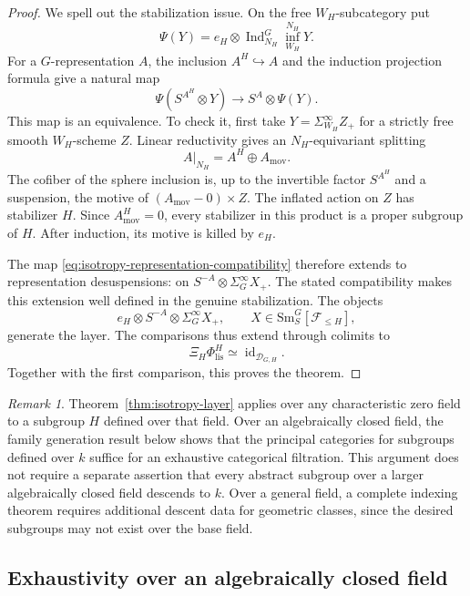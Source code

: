 \documentclass[11pt,reqno]{amsart}
\theoremstyle{definition}
\theoremstyle{remark}
\newtheorem{remark}[theorem]{Remark}
\theoremstyle{plain}
\numberwithin{equation}{section}
\newcommand{\Sm}{\mathrm{Sm}}
\newcommand{\lis}{\mathrm{lis}}
\newcommand{\D}{\mathcal D}
\newcommand{\F}{\mathcal F}
\begin{document}
\begin{proof}
We spell out the stabilization issue.
On the free \(W_H\)-subcategory put
\[
 \Psi(Y)=e_H\otimes
 \operatorname{Ind}_{N_H}^G\operatorname{inf}_{W_H}^{N_H}Y.
\]
For a \(G\)-representation \(A\), the inclusion \(A^H\hookrightarrow A\)
and the induction projection formula give a natural map
\begin{equation}\label{eq:isotropy-representation-compatibility}
 \Psi(S^{A^H}\otimes Y)\longrightarrow S^A\otimes\Psi(Y).
\end{equation}
This map is an equivalence.
To check it, first take \(Y=\Sigma^\infty_{W_H}Z_+\) for a strictly
free smooth \(W_H\)-scheme \(Z\).
Linear reductivity gives an \(N_H\)-equivariant splitting
\[
 A|_{N_H}=A^H\oplus A_{\mathrm{mov}}.
\]
The cofiber of the sphere inclusion is, up to the invertible
factor \(S^{A^H}\) and a suspension, the motive of
\((A_{\mathrm{mov}}-0)\times Z\).
The inflated action on \(Z\) has stabilizer \(H\).
Since \(A_{\mathrm{mov}}^H=0\), every stabilizer in this product
is a proper subgroup of \(H\).
After induction, its motive is killed by \(e_H\).

The map \eqref{eq:isotropy-representation-compatibility} therefore extends to representation desuspensions:
on \(S^{-A}\otimes\Sigma^\infty_GX_+\).
The stated compatibility makes this extension well defined in
the genuine stabilization.
The objects
\[
 e_H\otimes S^{-A}\otimes\Sigma^\infty_GX_+,
 \qquad X\in\Sm^G_S[\F_{\leq H}],
\]
generate the layer.
The comparisons thus extend through colimits to
\[
 \Xi_H\Phi_{\lis}^H\simeq\operatorname{id}_{\D_{G,H}}.
\]
Together with the first comparison, this proves the theorem.
\end{proof}

\begin{remark}\label{rem:arithmetic-isotropy}
Theorem~\ref{thm:isotropy-layer} applies over any characteristic zero
field to a subgroup \(H\) defined over that field.
Over an algebraically closed field, the family generation result
below shows that the principal categories for subgroups defined
over \(k\) suffice for an exhaustive categorical filtration.
This argument does not require a separate assertion that every
abstract subgroup over a larger algebraically closed field
descends to \(k\).
Over a general field, a complete indexing theorem requires
additional descent data for geometric classes, since the desired subgroups
may not exist over the base field.
\end{remark}

\subsection{Exhaustivity over an algebraically closed field}
\end{document}
